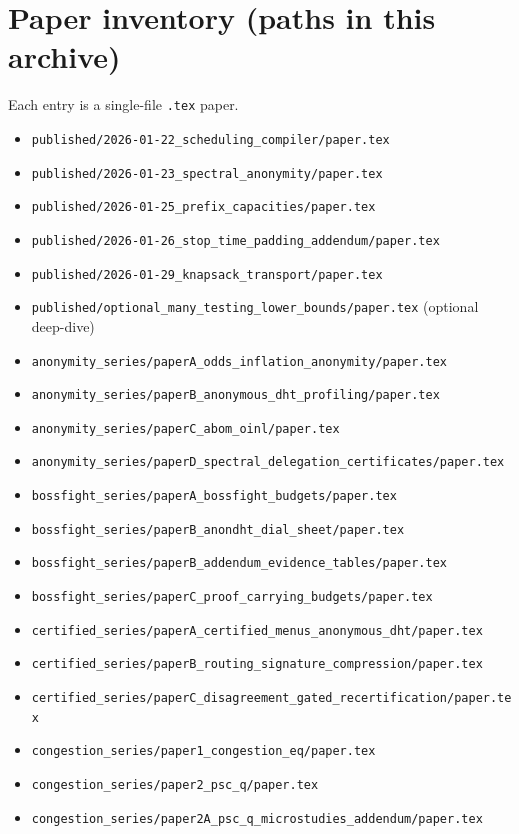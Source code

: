 \documentclass[11pt]{article}
\begin{document}
\section{Paper inventory (paths in this archive)}
Each entry is a single-file \texttt{.tex} paper.
\begin{itemize}[leftmargin=*]
\item \texttt{published/2026-01-22\_scheduling\_compiler/paper.tex}
\item \texttt{published/2026-01-23\_spectral\_anonymity/paper.tex}
\item \texttt{published/2026-01-25\_prefix\_capacities/paper.tex}
\item \texttt{published/2026-01-26\_stop\_time\_padding\_addendum/paper.tex}
\item \texttt{published/2026-01-29\_knapsack\_transport/paper.tex}
\item \texttt{published/optional\_many\_testing\_lower\_bounds/paper.tex} \quad (optional deep-dive)
\item \texttt{anonymity\_series/paperA\_odds\_inflation\_anonymity/paper.tex}
\item \texttt{anonymity\_series/paperB\_anonymous\_dht\_profiling/paper.tex}
\item \texttt{anonymity\_series/paperC\_abom\_oinl/paper.tex}
\item \texttt{anonymity\_series/paperD\_spectral\_delegation\_certificates/paper.tex}
\item \texttt{bossfight\_series/paperA\_bossfight\_budgets/paper.tex}
\item \texttt{bossfight\_series/paperB\_anondht\_dial\_sheet/paper.tex}
\item \texttt{bossfight\_series/paperB\_addendum\_evidence\_tables/paper.tex}
\item \texttt{bossfight\_series/paperC\_proof\_carrying\_budgets/paper.tex}
\item \texttt{certified\_series/paperA\_certified\_menus\_anonymous\_dht/paper.tex}
\item \texttt{certified\_series/paperB\_routing\_signature\_compression/paper.tex}
\item \texttt{certified\_series/paperC\_disagreement\_gated\_recertification/paper.tex}
\item \texttt{congestion\_series/paper1\_congestion\_eq/paper.tex}
\item \texttt{congestion\_series/paper2\_psc\_q/paper.tex}
\item \texttt{congestion\_series/paper2A\_psc\_q\_microstudies\_addendum/paper.tex}

\end{itemize}
\end{document}
